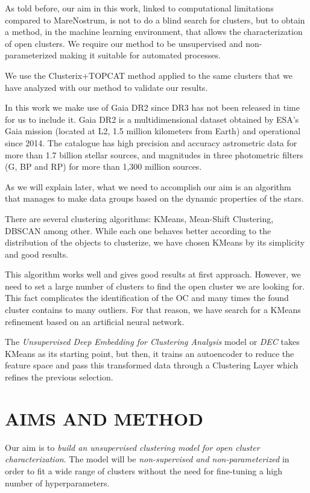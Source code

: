 \documentclass[11pt,a4paper,USenglish,twocolumn]{article}
\begin{document}
As told before, our aim in this work, linked to computational limitations compared
to MareNostrum, is not to do a blind search for clusters, but to obtain a method,
in the machine learning environment, that allows the characterization of open clusters.
We require our method to be unsupervised and non-parameterized making it suitable for
automated processes.

We use the Clusterix+TOPCAT method applied to the same clusters that we have analyzed
with our method to validate our results.

In this work we make use of Gaia DR2 since DR3 has not been released in time for us to include it.
Gaia DR2 is a multidimensional dataset obtained by ESA's Gaia mission
(located at L2, 1.5 million kilometers from Earth) and operational since 2014.
The catalogue has high precision and accuracy astrometric data for more than 1.7 billion stellar sources,
and magnitudes in three photometric filters (G, BP and RP) for more than 1,300 million sources.

As we will explain later, what we need to accomplish our aim is an algorithm
that manages to make data groups based on the dynamic properties of the stars.

There are several clustering algorithms: KMeans, Mean-Shift Clustering, DBSCAN \cite{ester1996density}
among other. While each one behaves better according to the distribution of the objects
to clusterize, we have chosen KMeans by its simplicity and good results.

This algorithm works well and gives good results at first approach.
However, we need to set a large number of clusters to find the open cluster we are looking for.
This fact complicates the identification of the OC and many times the found cluster contains to many outliers.
For that reason, we have search for a KMeans refinement based on an artificial neural network.

The \emph{Unsupervised Deep Embedding for Clustering Analysis} model
or \emph{DEC} \cite{xie2016unsupervised} takes KMeans as its starting point,
but then, it trains an autoencoder to reduce the feature space
and pass this transformed data through a Clustering Layer which refines the previous selection.

\section{AIMS AND METHOD}

Our aim is to \emph{build an unsupervised clustering model for open cluster characterization}.
The model will be \emph{non-supervised and non-parameterized} in order to fit a wide range
of clusters without the need for fine-tuning a high number of hyperparameters.
\end{document}
